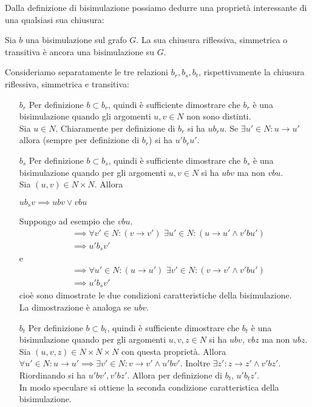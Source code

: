 Dalla definizione di bisimulazione possiamo dedurre una proprietà interessante di una qualsiasi sua chiusura:
\begin{theorem}
    Sia $b$ una bisimulazione sul grafo $G$. La sua chiusura riflessiva, simmetrica o transitiva è ancora una bisimulazione su $G$.
\end{theorem}
\begin{proof2}
    Consideriamo separatamente le tre relazioni $b_r, b_s, b_t$, rispettivamente la chiusura riflessiva, simmetrica e transitiva:
    \begin{itemize}
        \item[$b_r$] Per definizione $b \subset b_r$, quindi è sufficiente dimostrare che $b_r$ è una bisimulazione quando gli argomenti $u,v \in N$ non sono distinti.\\
        Sia $u \in N$. Chiaramente per definizione di $b_r$ si ha $u b_r u$. Se $\exists u' \in N : u \to u'$ allora (sempre per definizione di $b_r$) si ha $u' b_r u'$.
        \item[$b_s$] Per definizione $b \subset b_s$, quindi è sufficiente dimostrare che $b_s$ è una bisimulazione quando per gli argomenti $u,v \in N$ si ha $u b v$ ma non $v b u$.\\
        Sia $(u,v) \in N \times N$. Allora
        \begin{center}
            $u b_s v \implies u b v \lor v b u$
        \end{center}
        Suppongo ad esempio che $v b u$.
        \begin{align*}
            &\implies \forall v' \in N : (v \to v') \,\,\exists u' \in N : (u \to u' \land v' bu')\\
            &\implies u' b_s v'
        \end{align*}
        e
        \begin{align*}
            &\implies \forall u' \in N : (u \to u') \,\,\exists v' \in N : (v \to v' \land v' bu')\\
            &\implies u' b_s v'
        \end{align*}
        cioè sono dimostrate le due condizioni caratteristiche della bisimulazione.\\
        La dimostrazione è analoga se $u b v$.
        \item[$b_t$] Per definizione $b \subset b_t$, quindi è sufficiente dimostrare che $b_t$ è una bisimulazione quando per gli argomenti $u,v,z \in N$ si ha $u b v$, $v b z$ ma non $u b z$.\\
        Sia $(u,v,z) \in N \times N \times N$ con questa proprietà. Allora $\forall u' \in N : u \to u' \implies \exists v' \in N : v \to v' \land u' b v'$. Inoltre $\exists z' : z \to z' \land v' b z'$.\\
        Riordinando si ha $u' b v', v' b z'$. Allora per definizione di $b_t, \, u' b_t z'$.\\
        In modo speculare si ottiene la seconda condizione caratteristica della bisimulazione.
    \end{itemize}
\end{proof2}
